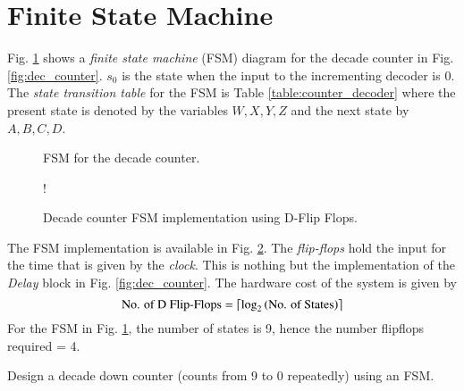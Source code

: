 \documentclass[journal,12pt,twocolumn]{IEEEtran}
\begin{document}
\section{Finite State Machine}
%
Fig. \ref{fig:fsm_counter} shows a {\em finite state machine} (FSM) diagram for the decade counter in Fig. \ref{fig:dec_counter}.  $s_0$ is the state when the input to the incrementing decoder is 0.  The {\em state transition table} for the FSM is Table \ref{table:counter_decoder} where the present state is denoted by the variables $W,X,Y,Z$ and the next state by $A,B,C,D$.  
\begin{figure}[!h]
\centering

\caption{FSM for the decade counter.}
\label{fig:fsm_counter}
\end{figure}
%
\begin{figure}[!h]
\resizebox {\columnwidth} {!} {

}
\caption{Decade counter FSM implementation using D-Flip Flops.}
\label{fig:dff}
\end{figure}
The FSM implementation is available in Fig. \ref{fig:dff}.  The {\em flip-flops} hold the input for the time that is given by the {\em clock}.  This is nothing but the implementation of the {\em Delay} block in Fig. \ref{fig:dec_counter}.
The hardware cost of the system is given by
\begin{equation}
\text{No. of D Flip-Flops} = \left \lceil \log_{2}\left(\text{No. of States}\right) \right \rceil
\end{equation}
For the FSM in Fig. \ref{fig:fsm_counter}, the number of states is 9, hence the number flipflops required = 4.  
\begin{problem}
Design a decade down counter (counts from 9 to 0 repeatedly) using an FSM.  
\end{problem}
%
%
\end{document}

